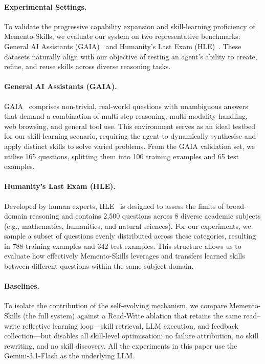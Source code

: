 \documentclass[11pt,a4paper]{article}
\begin{document}
\begin{sharedtrack}

\paragraph{Experimental Settings.} To validate the progressive capability expansion and skill-learning proficiency of Memento-Skills, we evaluate our system on two representative benchmarks: General AI Assistants (GAIA)~\cite{mialon2023gaia} and Humanity's Last Exam (HLE)~\cite{phan2025humanitysexam}. These datasets naturally align with our objective of testing an agent's ability to create, refine, and reuse skills across diverse reasoning tasks.

\paragraph{General AI Assistants (GAIA).} 
GAIA~\cite{mialon2023gaia} comprises non-trivial, real-world questions with unambiguous answers that demand a combination of multi-step reasoning, multi-modality handling, web browsing, and general tool use. This environment serves as an ideal testbed for our skill-learning scenario, requiring the agent to dynamically synthesise and apply distinct skills to solve varied problems. From the GAIA validation set, we utilise 165 questions, splitting them into 100 training examples and 65 test examples.

\paragraph{Humanity's Last Exam (HLE).} Developed by human experts, HLE~\cite{phan2025humanitysexam} is designed to assess the limits of broad-domain reasoning and contains 2,500 questions across 8 diverse academic subjects (e.g., mathematics, humanities, and natural sciences). For our experiments, we sample a subset of questions evenly distributed across these categories, resulting in 788 training examples and 342 test examples. This structure allows us to evaluate how effectively Memento-Skills leverages and transfers learned skills between different questions within the same subject domain.

\paragraph{Baselines.} To isolate the contribution of the self-evolving mechanism, we compare Memento-Skills (the full system) against a Read-Write ablation that retains the same read--write reflective learning loop---skill retrieval, LLM execution, and feedback collection---but disables all skill-level optimisation: no failure attribution, no skill rewriting, and no skill discovery. All the experiments in this paper use the Gemini-3.1-Flash as the underlying LLM.

\end{sharedtrack}
\end{document}

